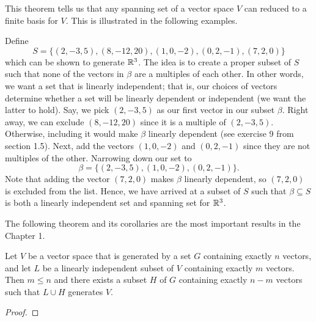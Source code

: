 This theorem tells us that any spanning set of a vector space \( V  \) can reduced to a finite basis for \( V  \). This is illustrated in the following examples.


\begin{eg}
    Define 
    \[  S = \{ (2,-3,5), (8,-12, 20), (1,0,-2), (0,2,-1), (7,2,0) \} \]
    which can be shown to generate \( \mathbb{R}^{3} \). The idea is to create a proper subset of \( S  \) such that none of the vectors in \( \beta \) are a multiples of each other. In other words, we want a set that is linearly independent; that is, our choices of vectors determine whether a set will be linearly dependent or independent (we want the latter to hold). Say, we pick \( (2,-3,5 ) \) as our first vector in our subset \( \beta \). Right away, we can exclude \( (8,-12,20) \) since it is a multiple of \( (2,-3,5) \). Otherwise, including it would make \( \beta \) linearly dependent (see exercise 9 from section 1.5). Next, add the vectors \( (1,0,-2) \) and \( (0,2,-1) \) since they are not multiples of the other. Narrowing down our set to 
    \[  \beta = \{ (2,-3,5), (1,0,-2), (0,2,-1) \}.  \]
    Note that adding the vector \( (7,2,0) \) makes \( \beta \) linearly dependent, so \( (7,2,0) \) is excluded from the list. Hence, we have arrived at a subset of \( S  \) such that \( \beta \subseteq S  \) is both a linearly independent set and spanning set for \( \mathbb{R}^{3}\).
\end{eg}

The following theorem and its corollaries are the most important results in the Chapter 1.


\begin{theorem}\label{Replacement Theorem}
   Let \( V  \) be a vector space that is generated by a set \( G  \) containing exactly \( n  \) vectors, and let \( L  \) be a linearly independent subset of \( V  \) containing exactly \( m  \) vectors. Then \( m \leq n  \) and there exists a subset \( H  \) of \( G  \) containing exactly \( n - m  \) vectors such that \( L \cup H  \) generates \( V  \).  
\end{theorem}
\begin{proof}

\end{proof}





